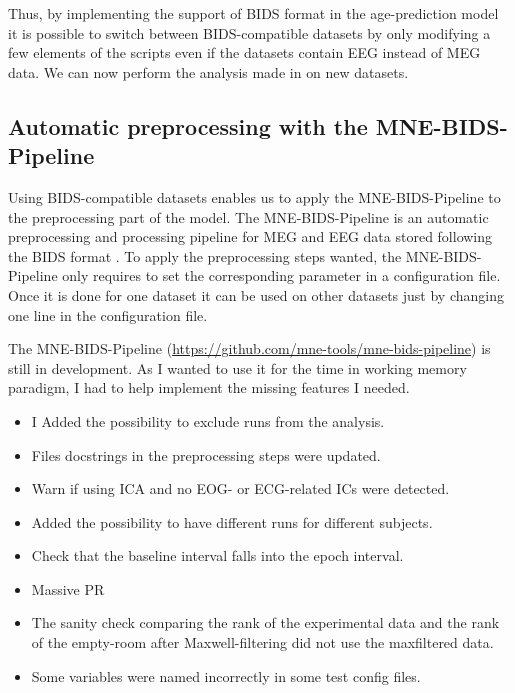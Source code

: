 Thus, by implementing the support of BIDS format in the age-prediction model it is possible to switch between BIDS-compatible datasets by only modifying a few elements of the scripts even
if the datasets contain EEG instead of MEG data. We can now perform the analysis made in
\cite{herbst2021abstracting} on new datasets.


\subsection{Automatic preprocessing with the MNE-BIDS-Pipeline}

Using BIDS-compatible datasets enables us to apply the MNE-BIDS-Pipeline to the preprocessing part of the model. The MNE-BIDS-Pipeline is an automatic preprocessing and processing pipeline for MEG and EEG data stored following the BIDS format \cite{gorgolewski2016brain}. To apply the preprocessing steps wanted, the MNE-BIDS-Pipeline only requires to set the corresponding parameter in a configuration file. Once it is done for one dataset it can be used on other datasets just by changing one line in the configuration file.

The MNE-BIDS-Pipeline (\url{https://github.com/mne-tools/mne-bids-pipeline}) is still in development. As I wanted to use it for the time in working memory paradigm, I had to help implement the missing features I needed.

\begin{itemize}
    \item I Added the possibility to exclude runs from the analysis.
    \item Files docstrings in the preprocessing steps were updated.
    \item Warn if using ICA and no EOG- or ECG-related ICs were detected.
    \item Added the possibility to have different runs for different subjects.
    \item Check that the baseline interval falls into the epoch interval.
    \item Massive PR
    \item The sanity check comparing the rank of the experimental data and the rank of the empty-room after Maxwell-filtering did not use the maxfiltered data.
    \item Some variables were named incorrectly in some test config files.
\end{itemize}

